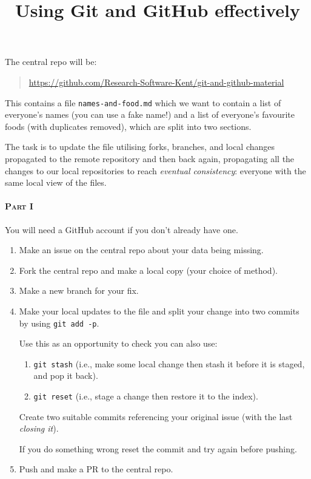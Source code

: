 \documentclass[a4paper]{article}
\title{Using Git and GitHub effectively}
\date{}
\begin{document}
\vspace{-4em}
\maketitle
\vspace{-2em}

\noindent
The central repo will be:

\begin{quote}
\url{https://github.com/Research-Software-Kent/git-and-github-material}
\end{quote}

This contains a file \texttt{names-and-food.md} which we want to contain a list of everyone's names (you can use a fake name!) and a list of everyone's favourite foods (with duplicates removed), which are split into two sections.

The task is to update the file utilising forks, branches, and local changes propagated to the remote repository and then back again, propagating all the changes to our local repositories to reach \emph{eventual consistency}: everyone with the same local view of the files.

\paragraph{ \textsc{Part I}} You will need a GitHub account if you don't
already have one.

\begin{enumerate}
\item Make an issue on the central repo about your data being missing.
\item Fork the central repo and make a local copy (your choice of method).
\item Make a new branch for your fix.
\item Make your local updates to the file and split your change into two commits by using \texttt{git add -p}.

Use this as an opportunity to check you can also use:

\begin{enumerate}
\item \texttt{git stash} (i.e., make some local change then stash it
before it is staged, and pop it back).
\item \texttt{git reset} (i.e., stage a change then restore it to the index).
\end{enumerate}

Create two suitable commits referencing your original issue (with
the last \emph{closing it}).

If you do something wrong reset the commit and try again before pushing.

\item Push and make a PR to the central repo.
\end{enumerate}
\end{document}
